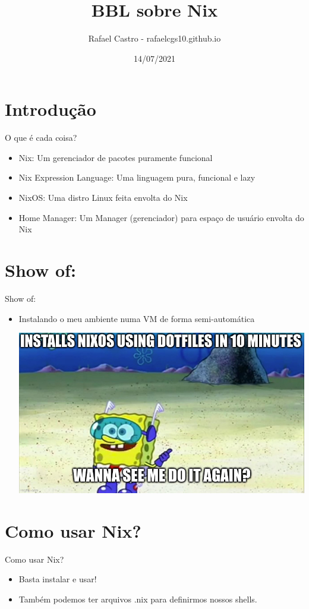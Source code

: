 \documentclass[presentation]{beamer}
\author{Rafael Castro - rafaelcgs10.github.io}
\date{14/07/2021}
\title{BBL sobre Nix}
\begin{document}
\maketitle

\section{Introdução}
\label{sec:org7f10dab}
\begin{frame}[label={sec:orgd3ea899}]{O que é cada coisa?}
\begin{itemize}
\item Nix: Um gerenciador de pacotes \alert{puramente funcional}
\item Nix Expression Language: Uma linguagem pura, funcional e lazy
\item NixOS: Uma distro Linux feita envolta do Nix
\item Home Manager: Um Manager (gerenciador) para espaço de usuário envolta do Nix
\end{itemize}
\end{frame}

\section{Show of:}
\label{sec:org92a068f}
\begin{frame}[label={sec:org4873b99}]{Show of:}
\begin{itemize}
\item Instalando o meu ambiente numa VM de forma semi-automática
\begin{center}
\includegraphics[width=.9\linewidth]{./meme1.jpg}
\end{center}
\end{itemize}
\end{frame}

\section{Como usar Nix?}
\label{sec:org2a07edd}
\begin{frame}[label={sec:org7f6d763}]{Como usar Nix?}
\begin{itemize}
\item Basta instalar e usar!
\item Também podemos ter arquivos .nix para definirmos nossos shells.
\end{itemize}
\end{frame}
\end{document}
